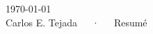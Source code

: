 \documentclass[11pt, a4paper]{awesome-resume}
\begin{document}
  \makecvheader
  \makecvfooter
    {\today\\}
    {Carlos E. Tejada~~~·~~~Resum\'e}
    {\thepage}

  
  
  
\end{document}
